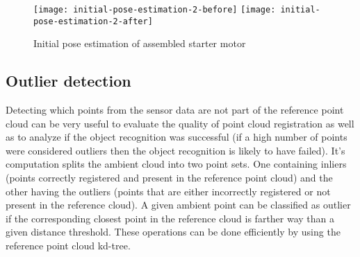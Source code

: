 
\begin{figure}[!ht]
	\centering
	\texttt{[image: initial-pose-estimation-2-before]}
	\hspace{0.5em}
	\texttt{[image: initial-pose-estimation-2-after]}
	\caption{Initial pose estimation of assembled starter motor}
	\label{fig:initial-pose-estimation}
\end{figure}


\subsection{Outlier detection}

Detecting which points from the sensor data are not part of the reference point cloud can be very useful to evaluate the quality of point cloud registration as well as to analyze if the object recognition was successful (if a high number of points were considered outliers then the object recognition is likely to have failed). It's computation splits the ambient cloud into two point sets. One containing inliers (points correctly registered and present in the reference point cloud) and the other having the outliers (points that are either incorrectly registered or not present in the reference cloud). A given ambient point can be classified as outlier if the corresponding closest point in the reference cloud is farther way than a given distance threshold. These operations can be done efficiently by using the reference point cloud kd-tree.
